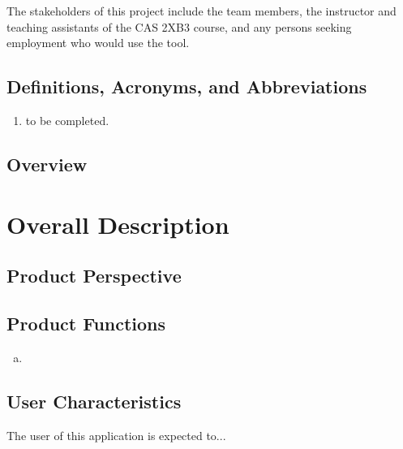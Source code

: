\documentclass[english]{article}
\begin{document}
The stakeholders of this project include the team members, the instructor and teaching assistants of the CAS 2XB3 course, and any persons seeking employment who would use the tool.



\subsection{Definitions, Acronyms, and Abbreviations}
\label{sub:definitions_acronyms_and_abbreviations}
\begin{enumerate}
	\item to be completed.
\end{enumerate}


\subsection{Overview}
\label{sub:overview}



\section{Overall Description}
\label{sec:overall_description}

\subsection{Product Perspective}
\label{sub:product_perspective}


\subsection{Product Functions}
\label{sub:product_functions}
\begin{enumerate}[a)]
	\item
\end{enumerate}

\subsection{User Characteristics}
\label{sub:user_characteristics}
The user of this application is expected to...
\end{document}
